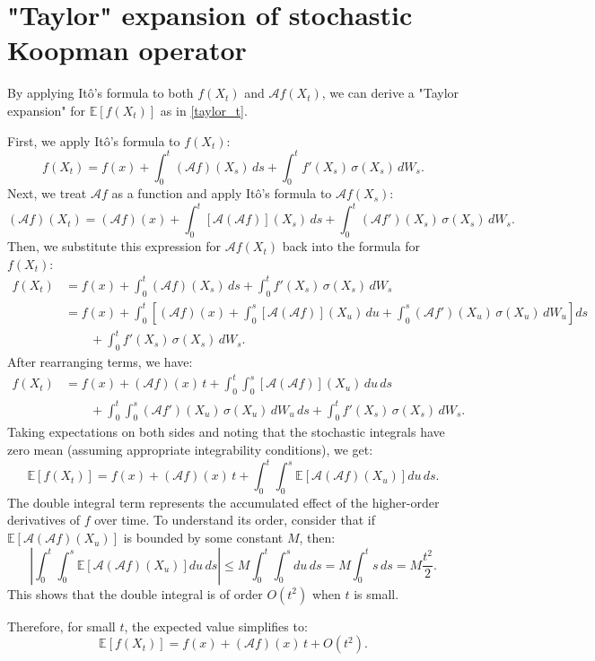 \documentclass{article}[11]
\begin{document}
	
	
	
	
	
	
	
	
	
	
	
	
	\appendix
	\newpage
	\section{"Taylor" expansion of stochastic Koopman operator}\label{expansion_Ito_formula}
	By applying It\^{o}'s formula to both \( f(X_t) \) and \( \mathcal{A} f(X_t) \), we can derive a "Taylor expansion" for \( \mathbb{E}[f(X_t)] \) as in \eqref{taylor_t}. 
	
	First, we apply It\^{o}'s formula to \( f(X_t) \):
	\[
	f(X_t) = f(x) + \int_0^t (\mathcal{A} f)(X_s)\, ds + \int_0^t f'(X_s)\, \sigma(X_s)\, dW_s.
	\]
	Next, we treat \( \mathcal{A} f \) as a function and apply It\^{o}'s formula to \( \mathcal{A} f(X_s) \):
	\[
	(\mathcal{A} f)(X_t) = (\mathcal{A} f)(x) + \int_0^t [\mathcal{A} (\mathcal{A} f)](X_s)\, ds + \int_0^t (\mathcal{A} f')(X_s)\, \sigma(X_s)\, dW_s.
	\]
	Then, we substitute this expression for \( \mathcal{A} f(X_t) \) back into the formula for \( f(X_t) \):
	\[
	\begin{aligned}
		f(X_t) &= f(x) + \int_0^t (\mathcal{A} f)(X_s)\, ds + \int_0^t f'(X_s)\, \sigma(X_s)\, dW_s \\
		&= f(x) + \int_0^t \left[ (\mathcal{A} f)(x) + \int_0^s [\mathcal{A} (\mathcal{A} f)](X_u)\, du + \int_0^s (\mathcal{A} f')(X_u)\, \sigma(X_u)\, dW_u \right] ds \\
		&\qquad + \int_0^t f'(X_s)\, \sigma(X_s)\, dW_s.
	\end{aligned}
	\]
	After rearranging terms, we have:
	\[
	\begin{aligned}
		f(X_t) &= f(x) + (\mathcal{A} f)(x)\, t + \int_0^t \int_0^s [\mathcal{A} (\mathcal{A} f)](X_u)\, du\, ds \\
		&\qquad + \int_0^t \int_0^s (\mathcal{A} f')(X_u)\, \sigma(X_u)\, dW_u\, ds + \int_0^t f'(X_s)\, \sigma(X_s)\, dW_s.
	\end{aligned}
	\]
	Taking expectations on both sides and noting that the stochastic integrals have zero mean (assuming appropriate integrability conditions), we get:
	\[
	\mathbb{E}[f(X_t)] = f(x) + (\mathcal{A} f)(x)\, t + \int_0^t \int_0^s \mathbb{E}\left[ \mathcal{A} (\mathcal{A} f)(X_u) \right] du\, ds.
	\]
	The double integral term represents the accumulated effect of the higher-order derivatives of \( f \) over time. To understand its order, consider that if \( \mathbb{E}\left[ \mathcal{A} (\mathcal{A} f)(X_u) \right] \) is bounded by some constant \( M \), then:
	\[
	\left| \int_0^t \int_0^s \mathbb{E}\left[ \mathcal{A} (\mathcal{A} f)(X_u) \right] du\, ds \right| \leq M \int_0^t \int_0^s du\, ds = M \int_0^t s\, ds = M \frac{t^2}{2}.
	\]
	This shows that the double integral is of order \( O(t^2) \) when \( t \) is small.
	
	Therefore, for small \( t \), the expected value simplifies to:
	\begin{equation}\label{expansion_ot2}
		\mathbb{E}[f(X_t)] = f(x) + (\mathcal{A} f)(x)\, t + O(t^2).
	\end{equation}
	
	
	
	
	
	
	
\end{document}
